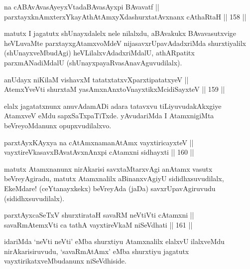 
\begin{shl}
na cABAvAvasAyeyxVtadaBAvasAyxpi BAvavatf || \\
parxtayxknAmxterxYkayAthAtAmxyXdashurxtatAvxnanx cAthaRtaH \hfill || 158 ||  
\end{shl}

\begin{artha}
matutx I jagatutx shUnayxdalelx nele nilalxdu, aBAvakukx
BAvavasutxvige heVLuvaMte parxtayxgAtamxvoMdeV nijasavxrUpavAdadxriMda
shurxtiyalilx (shUnayxveMbudAgi) heVLilalxvAdadxriMdalU, athARpatitx
parxmANadiMdalU (shUnayxpayaRvasAnavAguvudilalx).
\end{artha}

\begin{shl}
anUdayx niKilaM vishavxM tatatxtatxvXparxtipatatxyeV || \\
AtemxYveVti shurxtaM yasAmxnAnxtoV\s nayxtikxMcidiSayxteV \hfill || 159 ||  
\end{shl}

\begin{artha}
elalx jagatatxnunx anuvAdamADi adara tatavxvu tiLiyuvudakAkxgiye
AtamxveV eMdu sapxSaTxpaTiTxde. yAvudariMda I AtamxnigiMta
beVreyoMdanunx opupxvudilalxvo.
\end{artha}

\begin{shl}
parxtAyxKAyxya na cA\s \s tAmxnamanAtAmx vayxtiricayxteV || \\
vayxtireVkasavxBAvatAvxnAnxpi cA\s \s tamxni sidhayxti \hfill || 160 ||  
\end{shl}

\begin{artha}
matutx Atamxnanunx nirAkarisi savxtaMtarxvAgi anAtamx vasutx
beVreyAgiradu, matutx Atamxnalilx aBinanxvAgiyU sididhxsuvudilalx,
EkeMdare! (ceYtanayxkekx) beVreyAda (jaDa) savxrUpavAgiruvudu (sididhxsuvudilalx).
\end{artha}

\begin{shl}
parxtAyxcaSeTxV shurxtirataH savaRM neVtiVti cA\s \s tamxni || \\
savaRmAtemxVti ca tathA vayxtireVkaM niSeVdhati \hfill || 161 ||  
\end{shl}

\begin{artha}
idariMda `neVti neVti' eMba shurxtiyu Atamxnalilx elalxvU ilalxveMdu
nirAkarisiruvudu, `savaRmAtAmx' eMba shurxtiyu jagatutx
vayxtirikatxveMbudanunx niSeVdhiside.
\end{artha}

